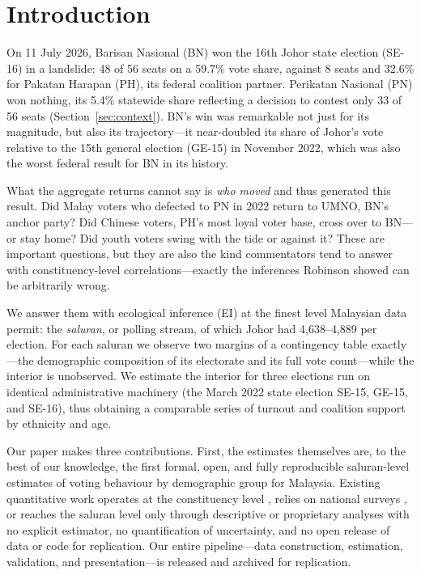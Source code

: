 \documentclass[11pt]{article}
\begin{document}

\newpage
{}

\section{Introduction}
\label{sec:intro}

On 11 July 2026, Barisan Nasional (BN) won the 16th Johor state election (SE-16) in a landslide: 48 of 56 seats on a 59.7\% vote share, against 8 seats and 32.6\% for Pakatan Harapan (PH), its federal coalition partner. Perikatan Nasional (PN) won nothing, its 5.4\% statewide share reflecting a decision to contest only 33 of 56 seats (Section~\ref{sec:context}). BN's win was remarkable not just for its magnitude, but also its trajectory---it near-doubled its share of Johor's vote relative to the 15th general election (GE-15) in November 2022, which was also the worst federal result for BN in its history.

What the aggregate returns cannot say is \emph{who moved} and thus generated this result. Did Malay voters who defected to PN in 2022 return to UMNO, BN's anchor party? Did Chinese voters, PH's most loyal voter base, cross over to BN---or stay home? Did youth voters swing with the tide or against it? These are important questions, but they are also the kind commentators tend to answer with constituency-level correlations---exactly the inferences Robinson\cite{robinson1950} showed can be arbitrarily wrong.

We answer them with ecological inference (EI) at the finest level Malaysian data permit: the \textit{saluran}, or polling stream, of which Johor had 4,638--4,889 per election. For each saluran we observe two margins of a contingency table exactly---the demographic composition of its electorate and its full vote count---while the interior is unobserved. We estimate the interior for three elections run on identical administrative machinery (the March 2022 state election SE-15, GE-15, and SE-16), thus obtaining a comparable series of turnout and coalition support by ethnicity and age.

Our paper makes three contributions. First, the estimates themselves are, to the best of our knowledge, the first formal, open, and fully reproducible saluran-level estimates of voting behaviour by demographic group for Malaysia. Existing quantitative work operates at the constituency level \cite{pepinsky2015,dettmanpepinsky2024,chen2026}, relies on national surveys \cite{marzukisuffian2023}, or reaches the saluran level only through descriptive or proprietary analyses with no explicit estimator, no quantification of uncertainty, and no open release of data or code for replication\cite{zhanghutchinson2022,welsh2026b}. Our entire pipeline---data construction, estimation, validation, and presentation---is released and archived for replication.
\end{document}
